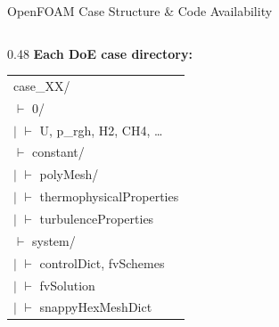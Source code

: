 \documentclass[10pt, aspectratio=169]{beamer}
\begin{document}
\begin{frame}[fragile]{OpenFOAM Case Structure \& Code Availability}
    \begin{columns}[T]
        \begin{column}{0.48\textwidth}
            \textbf{Each DoE case directory:}

            \vspace{0.3em}
            \ttfamily\scriptsize
            \begin{tabular}{@{}l@{}}
                case\_XX/ \\
                \hspace{0.6em}$\vdash$\hspace{0.3em} 0/\hspace{3.5em}{\rmfamily\itshape Boundary conditions} \\
                \hspace{0.6em}$\mid$\hspace{0.6em} $\vdash$ U, p\_rgh, H2, CH4, \ldots \\
                \hspace{0.6em}$\vdash$\hspace{0.3em} constant/ \\
                \hspace{0.6em}$\mid$\hspace{0.6em} $\vdash$ polyMesh/\hspace{0.5em}{\rmfamily\itshape Mesh} \\
                \hspace{0.6em}$\mid$\hspace{0.6em} $\vdash$ thermophysicalProperties \\
                \hspace{0.6em}$\mid$\hspace{0.6em} $\vdash$ turbulenceProperties \\
                \hspace{0.6em}$\vdash$\hspace{0.3em} system/ \\
                \hspace{0.6em}$\mid$\hspace{0.6em} $\vdash$ controlDict, fvSchemes \\
                \hspace{0.6em}$\mid$\hspace{0.6em} $\vdash$ fvSolution \\
                \hspace{0.6em}$\mid$\hspace{0.6em} $\vdash$ snappyHexMeshDict \\

\end{tabular}
\end{column}
\end{columns}
\end{frame}
\end{document}

